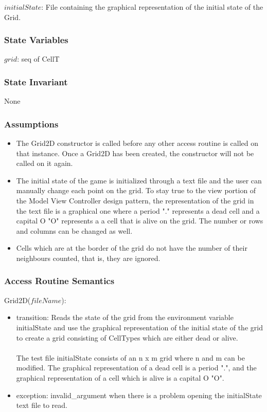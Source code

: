 \documentclass[12pt]{article}
\begin{document}
$initialState$: File containing the graphical representation of the initial state of the Grid.

\subsubsection* {State Variables}

$grid$: seq of CellT

\subsubsection* {State Invariant}

None

\subsubsection* {Assumptions}

\begin{itemize}
	\item The Grid2D constructor is called before any other access routine is called on that instance. Once a Grid2D has been created, the constructor will not be called on it again.
	\item The initial state of the game is initialized through a text file and the user can manually change each point on the grid. To stay true to the view portion of the Model View Controller design pattern, the representation of the grid in the text file is a graphical one where a period "." represents a dead cell and a capital O "O" represents a a cell that is alive on the grid. The number or rows and columns can be changed as well.
	\item Cells which are at the border of the grid do not have the number of their neighbours counted, that is, they are ignored.
\end{itemize} 

\subsubsection* {Access Routine Semantics}

Grid2D($fileName$):
\begin{itemize}
\item transition: Reads the state of the grid from the environment variable initialState and use the graphical representation of the initial state of the grid to create a grid consisting of CellTypes which are either dead or alive.\\\\
The test file initialState consists of an n x m grid where n and m can be modified. The graphical representation of a dead cell is a period ".", and the graphical representation of a cell which is alive is a capital O "O".
\item exception: invalid\_argument when there is a problem opening the initialState text file to read. 
\end{itemize}
\end{document}
